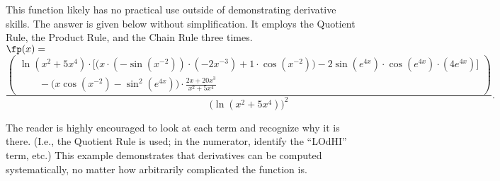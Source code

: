 {This function likely has no practical use outside of demonstrating derivative skills. The answer is given below without simplification. It employs the Quotient Rule, the Product Rule, and the Chain Rule three times.\\

\scriptsize
\noindent $\fp(x) = $
$$\frac{\left(\begin{array}{l}\ln(x^2+5x^4)\cdot\Big[\big(x\cdot(-\sin(x^{-2}))\cdot(-2x^{-3})+1\cdot \cos(x^{-2})\big)-2\sin(e^{4x})\cdot\cos(e^{4x})\cdot(4e^{4x})\Big]\\
\qquad-\Big(x\cos(x^{-2})-\sin^2(e^{4x})\Big)\cdot\frac{2x+20x^3}{x^2+5x^4}\end{array}\right)}{\big(\ln(x^2+5x^4)\big)^2}.$$
\normalsize

The reader is highly encouraged to look at each term and recognize why it is there. (I.e., the Quotient Rule is used; in the numerator, identify the ``LOdHI'' term, etc.)  This example demonstrates that derivatives can be computed systematically, no matter how arbitrarily complicated the function is.
}\\

